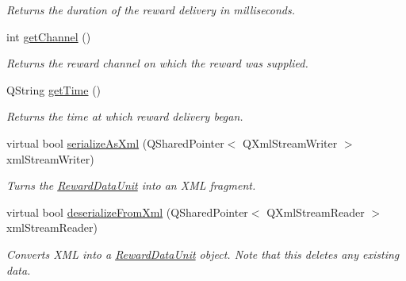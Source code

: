 \begin{DoxyCompactItemize}
\begin{DoxyCompactList}\small\item\em Returns the duration of the reward delivery in milliseconds. \end{DoxyCompactList}\item 
\hypertarget{class_picto_1_1_reward_data_unit_a882f8c45fce616a3a7e9fa559fc22697}{int \hyperlink{class_picto_1_1_reward_data_unit_a882f8c45fce616a3a7e9fa559fc22697}{get\-Channel} ()}\label{class_picto_1_1_reward_data_unit_a882f8c45fce616a3a7e9fa559fc22697}

\begin{DoxyCompactList}\small\item\em Returns the reward channel on which the reward was supplied. \end{DoxyCompactList}\item 
\hypertarget{class_picto_1_1_reward_data_unit_a34ff878d9ba65ae4ac65614487d53736}{Q\-String \hyperlink{class_picto_1_1_reward_data_unit_a34ff878d9ba65ae4ac65614487d53736}{get\-Time} ()}\label{class_picto_1_1_reward_data_unit_a34ff878d9ba65ae4ac65614487d53736}

\begin{DoxyCompactList}\small\item\em Returns the time at which reward delivery began. \end{DoxyCompactList}\item 
\hypertarget{class_picto_1_1_reward_data_unit_a1490fd9fc0456c1b3b5b3bade16d054c}{virtual bool \hyperlink{class_picto_1_1_reward_data_unit_a1490fd9fc0456c1b3b5b3bade16d054c}{serialize\-As\-Xml} (Q\-Shared\-Pointer$<$ Q\-Xml\-Stream\-Writer $>$ xml\-Stream\-Writer)}\label{class_picto_1_1_reward_data_unit_a1490fd9fc0456c1b3b5b3bade16d054c}

\begin{DoxyCompactList}\small\item\em Turns the \hyperlink{class_picto_1_1_reward_data_unit}{Reward\-Data\-Unit} into an X\-M\-L fragment. \end{DoxyCompactList}\item 
\hypertarget{class_picto_1_1_reward_data_unit_ae59dc04996da87d9dad2757c41dd62b3}{virtual bool \hyperlink{class_picto_1_1_reward_data_unit_ae59dc04996da87d9dad2757c41dd62b3}{deserialize\-From\-Xml} (Q\-Shared\-Pointer$<$ Q\-Xml\-Stream\-Reader $>$ xml\-Stream\-Reader)}\label{class_picto_1_1_reward_data_unit_ae59dc04996da87d9dad2757c41dd62b3}

\begin{DoxyCompactList}\small\item\em Converts X\-M\-L into a \hyperlink{class_picto_1_1_reward_data_unit}{Reward\-Data\-Unit} object. Note that this deletes any existing data. \end{DoxyCompactList}\end{DoxyCompactItemize}
